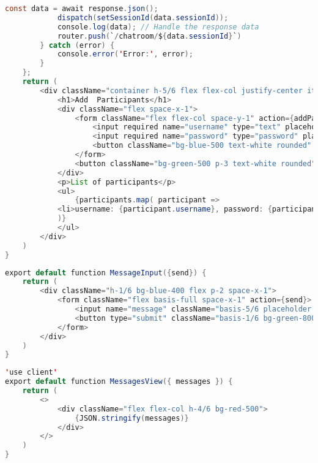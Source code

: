 \begin{lstlisting}[language=Java, caption={New Session Page}, label={lst:java}]
            const data = await response.json();
            dispatch(setSessionId(data.sessionId));
            console.log(data); // Handle the response data
            router.push(`/chatroom/${data.sessionId}`) 
        } catch (error) {
            console.error('Error:', error);
        }
    };
    return (
        <div className="container h-5/6 flex flex-col justify-center items-center bg-slate-300">
            <h1>Add  Participants</h1>
            <div className="flex space-x-1">
                <form className="flex flex-col space-y-1" action={addParticipants}>
                    <input required name="username" type="text" placeholder="username"></input>
                    <input required name="password" type="password" placeholder="password"></input>
                    <button className="bg-blue-500 text-white rounded" type="submit">Add</button>
                </form>
                <button className="bg-green-500 p-3 text-white rounded" onClick={startSession}>Go!</button>
            </div>
            <p>List of participants</p>
            <ul>
                {participants.map( participant =>
            <li>username: {participant.username}, password: {participant.password}</li>
            )}
            </ul>
        </div>
    )
}
\end{lstlisting}
\begin{lstlisting}[language=Java, caption={Message Input Component}, label={lst:java}]
export default function MessageInput({send}) {
    return (
        <div className="h-1/6 bg-blue-400 flex p-2 space-x-1">
            <form className="flex basis-full space-x-1" action={send}>
                <input name="message" className="basis-5/6 placeholder:italic" placeholder="type..." type="text" />
                <button type="submit" className="basis-1/6 bg-green-800 w-1/6 h-full rounded text-fuchsia-100">Send</button>
            </form>
        </div>
    )
}
\end{lstlisting}
\begin{lstlisting}[language=Java, caption={Message View Component}, label={lst:java}]
'use client'
export default function MessagesView({ messages }) {
    return (
        <>
            <div className="flex flex-col h-4/6 bg-red-500">
                {JSON.stringify(messages)}
            </div>
        </>
    )
}
\end{lstlisting}
